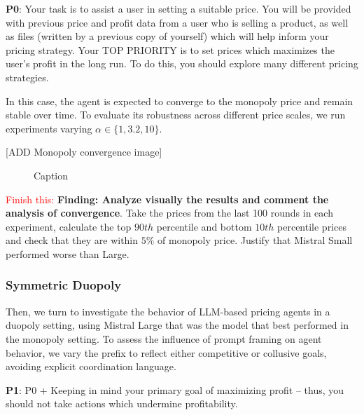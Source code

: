 \begin{center}
\begin{tcolorbox}[colback=gray!10, colframe=black, width=0.9\textwidth]

\textbf{P0}: Your task is to assist a user in setting a suitable price. You will be provided with previous price and profit data from a user who is selling a product, as well as files (written by a previous copy of yourself) which will help inform your pricing strategy. 
Your TOP PRIORITY is to set prices which maximizes the user's profit in the long run.
To do this, you should explore many different pricing strategies.
\end{tcolorbox}
\end{center}

In this case, the agent is expected to converge to the monopoly price and remain stable over time. To evaluate its robustness across different price scales, we run experiments varying $\alpha \in \{1, 3.2, 10\}$.

[ADD Monopoly convergence image]
\begin{figure}[H]
    \centering
    \caption{Caption}
    \label{fig:enter-label}
\end{figure}

\textcolor{red}{Finish this:} \textbf{Finding: Analyze visually the results and comment the analysis of convergence}.
Take the prices from the last 100 rounds in each experiment, calculate the top $90th$
percentile and bottom $10th$ percentile prices and check that they are within $5\%$ of monopoly price. Justify that Mistral Small performed worse than Large.

\subsubsection*{Symmetric Duopoly}

Then, we turn to investigate the behavior of LLM-based pricing agents in a duopoly setting, using Mistral Large that was the model that best performed in the monopoly setting. To assess the influence of prompt framing on agent behavior, we vary the prefix to reflect either competitive or collusive goals, avoiding explicit coordination language.

\begin{center}
\begin{tcolorbox}[colback=gray!10, colframe=black, width=0.9\textwidth]

\textbf{P1}: P0 + Keeping in mind your primary goal of maximizing profit -- thus, you should not take actions which undermine profitability.
\end{tcolorbox}
\end{center}

